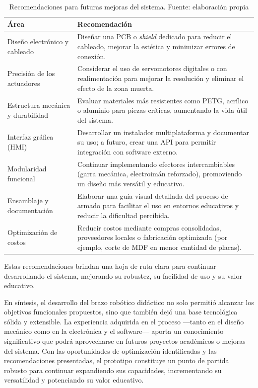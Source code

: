 \begin{table}[H]
\centering
\caption{Recomendaciones para futuras mejoras del sistema. Fuente: elaboración propia}
\label{tab:recomendaciones}
\begin{tabular}{p{} p{}}
\toprule
\textbf{Área} & \textbf{Recomendación} \\
\midrule

Diseño electrónico y cableado &
Diseñar una PCB o \emph{shield} dedicado para reducir el cableado, mejorar la estética y minimizar errores de conexión. \\

Precisión de los actuadores &
Considerar el uso de servomotores digitales o con realimentación para mejorar la resolución y eliminar el efecto de la zona muerta. \\

Estructura mecánica y durabilidad &
Evaluar materiales más resistentes como PETG, acrílico o aluminio para piezas críticas, aumentando la vida útil del sistema. \\

Interfaz gráfica (HMI) &
Desarrollar un instalador multiplataforma y documentar su uso; a futuro, crear una API para permitir integración con software externo. \\

Modularidad funcional &
Continuar implementando efectores intercambiables (garra mecánica, electroimán reforzado), promoviendo un diseño más versátil y educativo. \\

Ensamblaje y documentación &
Elaborar una guía visual detallada del proceso de armado para facilitar el uso en entornos educativos y reducir la dificultad percibida. \\

Optimización de costos &
Reducir costos mediante compras consolidadas, proveedores locales o fabricación optimizada (por ejemplo, corte de MDF en menor cantidad de placas). \\
\bottomrule
\end{tabular}
\end{table}

Estas recomendaciones brindan una hoja de ruta clara para continuar desarrollando el sistema, mejorando su robustez, su facilidad de uso y su valor educativo.


\vspace{1em}

En síntesis, el desarrollo del brazo robótico didáctico no solo permitió alcanzar los objetivos funcionales propuestos, sino que también dejó una base tecnológica sólida y extensible. La experiencia adquirida en el proceso —tanto en el diseño mecánico como en la electrónica y el software— aporta un conocimiento significativo que podrá aprovecharse en futuros proyectos académicos o mejoras del sistema. Con las oportunidades de optimización identificadas y las recomendaciones presentadas, el prototipo constituye un punto de partida robusto para continuar expandiendo sus capacidades, incrementando su versatilidad y potenciando su valor educativo.